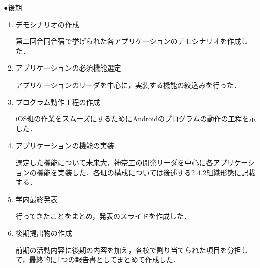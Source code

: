 \par ●後期
\begin{enumerate}
\item デモシナリオの作成
\par 第二回合同合宿で挙げられた各アプリケーションのデモシナリオを作成した．
\item アプリケーションの必須機能選定
\par アプリケーションのリーダを中心に，実装する機能の絞込みを行った．
\item プログラム動作工程の作成
\par iOS班の作業をスムーズにするためにAndroidのプログラムの動作の工程を示した．
\item アプリケーションの機能の実装
\par 選定した機能について未来大，神奈工の開発リーダを中心に各アプリケーションの機能を実装した．各班の構成については後述する2.4.2組織形態に記載する．
\item 学内最終発表
\par 行ってきたことをまとめ，発表のスライドを作成した．
\item 後期提出物の作成
\par 前期の活動内容に後期の内容を加え，各校で割り当てられた項目を分担して，最終的に1つの報告書としてまとめて作成した．
\end{enumerate}
